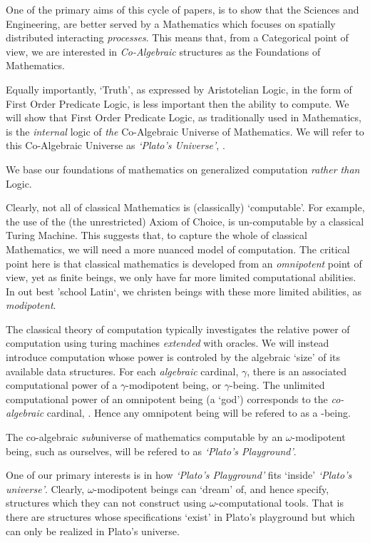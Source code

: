 \documentclass[a4paper,openany]{amsbook}
\begin{document}
One of the primary aims of this cycle of papers, is to show that the Sciences
and Engineering, are better served by a Mathematics which focuses on spatially
distributed interacting \emph{processes}. This means that, from a Categorical
point of view, we are interested in \emph{Co-Algebraic} structures as the
Foundations of Mathematics.

Equally importantly, `Truth', as expressed by Aristotelian Logic, in the form of
First Order Predicate Logic, is less important then the ability to compute. We
will show that First Order Predicate Logic, as traditionally used in
Mathematics, is the \emph{internal} logic of \emph{the} Co-Algebraic Universe of
Mathematics. We will refer to this Co-Algebraic Universe as \emph{`Plato's
Universe'}, \Universe.

We base our foundations of mathematics on generalized computation \emph{rather
than} Logic.

Clearly, not all of classical Mathematics is (classically) `computable'. For
example, the use of the (the unrestricted) Axiom of Choice, is un-computable by
a classical Turing Machine. This suggests that, to capture the whole of
classical Mathematics, we will need a more nuanced model of computation. The
critical point here is that classical mathematics is developed from an
\emph{omnipotent} point of view, yet as finite beings, we only have far more
limited computational abilities. In out best 'school Latin`, we christen beings
with these more limited abilities, as \emph{modipotent}.

The classical theory of computation typically investigates the relative power of
computation using turing machines \emph{extended} with oracles. We will instead
introduce computation whose power is controled by the algebraic `size' of its
available data structures. For each \emph{algebraic} cardinal, $\gamma$, there
is an associated computational power of a $\gamma$-modipotent being, or
$\gamma$-being. The unlimited computational power of an omnipotent being (a
`god') corresponds to the \emph{co-algebraic} cardinal, \Cardinal. Hence any
omnipotent being will be refered to as a \Cardinal-being.

The co-algebraic \emph{sub}universe of mathematics computable by an
$\omega$-modipotent being, such as ourselves, will be refered to as
\emph{`Plato's Playground'}.

One of our primary interests is in how \emph{`Plato's Playground'} fits `inside'
\emph{`Plato's universe'}. Clearly, $\omega$-modipotent beings can `dream' of,
and hence specify, structures which they can not construct using
$\omega$-computational tools. That is there are structures whose specifications
`exist' in Plato's playground but which can only be realized in Plato's
universe.
\end{document}
